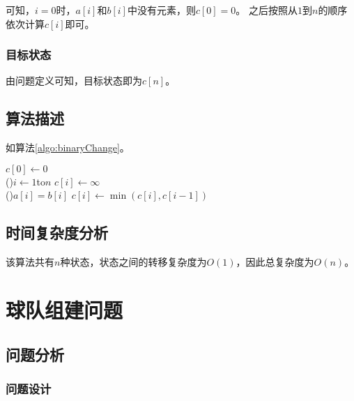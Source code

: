 可知，$i = 0$时，$a[i]$和$b[i]$中没有元素，则$c[0] = 0$。
之后按照从$1$到$n$的顺序依次计算$c[i]$即可。

\subsubsection{目标状态}

由问题定义可知，目标状态即为$c[n]$。

\subsection{算法描述}

如算法\ref{algo:binaryChange}。

\begin{algorithm}[H]
    \caption{$binaryChange(a[1..n], b[1..n])$}\label{algo:binaryChange}
    $c[0] \leftarrow 0$\\

    \For(){$i \leftarrow 1$to$n$}{
        $c[i] \leftarrow \infty$\\
        \If(){$a[i]=b[i]$}{
            $c[i] \leftarrow \min(c[i],c[i-1])$\\
        }
    }
    
\end{algorithm}

\subsection{时间复杂度分析}
该算法共有$n$种状态，状态之间的转移复杂度为$O(1)$，因此总复杂度为$O(n)$。

\section{球队组建问题}

\subsection{问题分析}

\subsubsection{问题设计}

